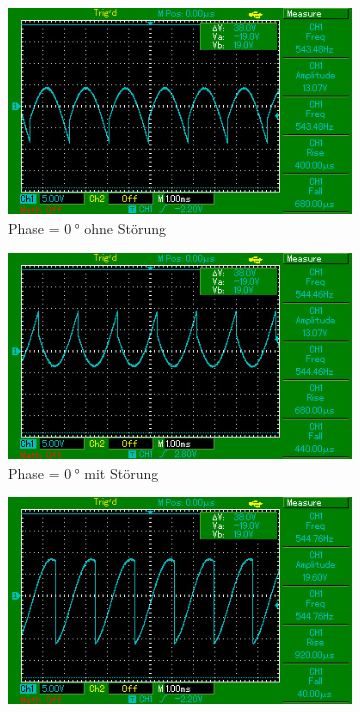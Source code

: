 \thispagestyle{empty}
\begin{figure}[H]
\caption{Phasendiagramme}
\label{fig:3}
    \begin{subfigure}{0.495\linewidth} %
        \centering
        \includegraphics[width=\textwidth]{images/aufg2_phi0.jpg}
        \caption{Phase = $\SI{0}{\degree}$ ohne Störung}
        \label{fig:3a}
    \end{subfigure}
    \begin{subfigure}{0.495\linewidth}
        \centering
        \includegraphics[width=\textwidth]{images/aufg3_phi0.jpg}
        \caption{Phase = $\SI{0}{\degree}$ mit Störung}
        \label{fig:3b}
    \end{subfigure}
    \begin{subfigure}{0.495\linewidth} %
        \centering
        \includegraphics[width=\textwidth]{images/aufg2_phi90.jpg}

\end{subfigure}
\end{figure}
